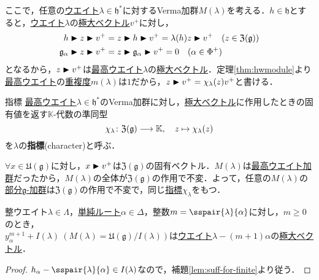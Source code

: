 \documentclass[rep_main]{subfiles}
\begin{document}
ここで，任意の\hyperref[def:weight-rep]{ウエイト}$\lambda \in \mathfrak{h}^*$に対するVerma加群$M(\lambda)$を考える．$h \in \mathfrak{h}$とすると，\hyperref[def:weight-rep]{ウエイト}$\lambda$の\hyperref[def:maximal-vector-rep]{極大ベクトル}$v^+$に対し，
\begin{align}
	h \blacktriangleright z \blacktriangleright v^+ &= z \blacktriangleright h \blacktriangleright v^+ = \lambda(h)z \blacktriangleright v^+\quad  (z \in \mathfrak{Z}(\mathfrak{g})) \\
	\mathfrak{g}_\alpha \blacktriangleright z \blacktriangleright v^+ &= z \blacktriangleright \mathfrak{g}_\alpha \blacktriangleright v^+ = 0\quad  (\alpha \in \Phi^+)
\end{align}
となるから，$z \blacktriangleright v^+$は\hyperref[def:highest-weight-module]{最高ウエイト}$\lambda$の\hyperref[def:maximal-vector-rep]{極大ベクトル}．定理\ref{thm:hwmodule}より\hyperref[def:highest-weight-module]{最高ウエイト}の\hyperref[def:mutiplicity]{重複度}$m(\lambda)$は$1$だから，$z \blacktriangleright v^+ = \chi_\lambda(z) v^+$と書ける．
\begin{mydef}[label=def:character]{指標}
	\hyperref[def:highest-weight-module]{最高ウエイト}$\lambda \in \mathfrak{h}^*$のVerma加群に対し，\hyperref[def:maximal-vector-rep]{極大ベクトル}に作用したときの固有値を返す$\mathbb{K}$-代数の準同型
	\begin{equation}
		\chi_\lambda \colon \mathfrak{Z}(\mathfrak{g}) \longrightarrow \mathbb{K},\quad  z \mapsto \chi_\lambda(z)
	\end{equation}
	を$\lambda$の\textbf{指標}(character)と呼ぶ．
\end{mydef}
$\forall x \in \mathfrak{U}(\mathfrak{g})$に対し，$x \blacktriangleright v^+$は$\mathfrak{Z}(\mathfrak{g})$の固有ベクトル．$M(\lambda)$は\hyperref[def:highest-weight-module]{最高ウエイト加群}だったから，$M(\lambda)$の全体が$\mathfrak{Z}(\mathfrak{g})$の作用で不変．よって，任意の$M(\lambda)$の\hyperref[def:sub-g-module]{部分$\mathfrak{g}$-加群}は$\mathfrak{Z}(\mathfrak{g})$の作用で不変で，同じ\hyperref[def:character]{指標}$\chi_\lambda$をもつ．
\begin{myprop}[label=prop:hmmodule-character]{}
	整ウエイト$\lambda \in \Lambda$，\hyperref[def:base-root]{単純ルート}$\alpha \in \Delta$，整数$m = \sspair{\lambda}{\alpha}$に対し，$m \geq 0$のとき，\\
	$y_\alpha^{m+1} + I(\lambda)\ (M(\lambda) = \mathfrak{U}(\mathfrak{g}) / I(\lambda))$は\hyperref[def:weight-rep]{ウエイト}$\lambda - (m+1)\alpha$の\hyperref[def:maximal-vector-rep]{極大ベクトル}．
\end{myprop}
\begin{proof}
	$h_\alpha - \sspair{\lambda}{\alpha} \in I(\lambda)$なので，補題\ref{lem:suff-for-finite}より従う．
\end{proof}
\end{document}
